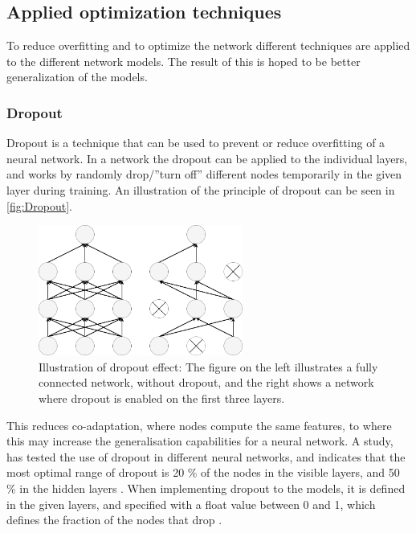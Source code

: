 \subsection{Applied optimization techniques}
To reduce overfitting and to optimize the network different techniques are applied to the different network models. The result of this is hoped to be better generalization of the models. 

\subsubsection{Dropout}
Dropout is a technique that can be used to prevent or reduce overfitting of a neural network. In a network the dropout can be applied to the individual layers, and works by randomly drop/”turn off” different nodes temporarily in the given layer during training. An illustration of the principle of dropout can be seen in \autoref{fig:Dropout}.  

\begin{figure} [H]
\centering
\includegraphics[width=0.6\textwidth]{figures/Dropout}
\caption{Illustration of dropout effect: The figure on the left illustrates a fully connected network, without dropout, and the right shows a network where dropout is enabled on the first three layers.}
\label{fig:Dropout}  
\end{figure}

This reduces co-adaptation, where nodes compute the same features, to where this may increase the generalisation capabilities for a neural network.\citep{Srivastava2014}  
A study, has tested the use of dropout in different neural networks, and indicates that the most optimal range of dropout is 20 \% of the nodes in the visible layers, and 50 \% in the hidden layers \citep{Srivastava2014}.
When implementing dropout to the models, it is defined in the given layers, and specified with a float value between 0 and 1, which defines the fraction of the nodes that drop \citep{Chollet2015}.



